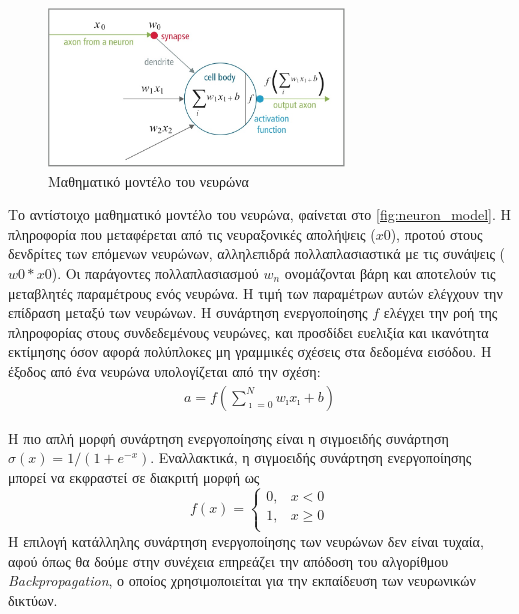 \begin{figure}[!ht]
  \centering
  \includegraphics[width=0.7\textwidth]{./images/chapter3/neuron_model.jpg}
  \caption[Μαθηματικό μοντέλο του νευρώνα]{Μαθηματικό μοντέλο του νευρώνα}
  \label{fig:neuron_model}
\end{figure}

Το αντίστοιχο μαθηματικό μοντέλο του νευρώνα, φαίνεται στο \autoref{fig:neuron_model}.
Η πληροφορία που μεταφέρεται από τις νευραξονικές απολήψεις ($x0$), προτού
στους δενδρίτες των επόμενων νευρώνων, αλληλεπιδρά πολλαπλασιαστικά με τις
συνάψεις ($w0*x0$). Οι παράγοντες πολλαπλασιασμού $w_n$ ονομάζονται βάρη
και αποτελούν τις μεταβλητές παραμέτρους ενός νευρώνα. Η τιμή των παραμέτρων
αυτών ελέγχουν την επίδραση μεταξύ των νευρώνων. Η συνάρτηση ενεργοποίησης $f$
ελέγχει την ροή της πληροφορίας στους συνδεδεμένους νευρώνες,
και προσδίδει ευελιξία και ικανότητα εκτίμησης όσον αφορά πολύπλοκες μη γραμμικές
σχέσεις στα δεδομένα εισόδου. Η έξοδος από ένα νευρώνα υπολογίζεται από την σχέση:
\begin{gather*}
  a = f(\sum_{\imath=0}^{N}w_{\imath}x_{\imath} + b)
\end{gather*}

Η πιο απλή μορφή συνάρτηση ενεργοποίησης
είναι η σιγμοειδής συνάρτηση $\sigma(x) = 1 / (1 + e^{-x})$.
Εναλλακτικά, η σιγμοειδής συνάρτηση ενεργοποίησης μπορεί να εκφραστεί σε διακριτή μορφή ως
\[
f(x) =
  \begin{cases}
    0, & x < 0 \\
    1, & x \geq 0 \\
  \end{cases}
\]
Η επιλογή κατάλληλης συνάρτηση ενεργοποίησης των
νευρώνων δεν είναι τυχαία, αφού όπως θα δούμε στην
συνέχεια επηρεάζει την απόδοση του αλγορίθμου \emph{Backpropagation}, ο οποίος
χρησιμοποιείται για την εκπαίδευση των νευρωνικών δικτύων.

